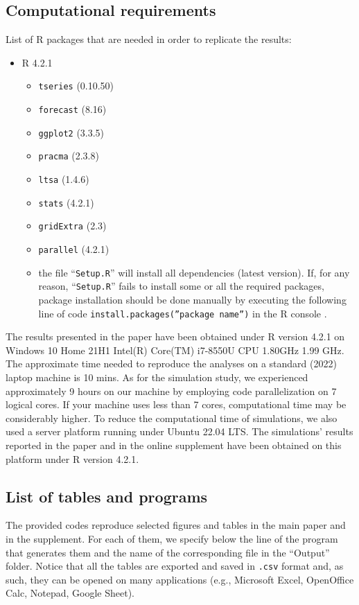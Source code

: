 \documentclass[
]{article}
\providecommand{\tightlist}{%
  \setlength{\itemsep}{0pt}\setlength{\parskip}{0pt}}
\begin{document}
\hypertarget{computational-requirements}{%
\subsection{Computational requirements}\label{computational-requirements}}
List of R packages that are needed in order to replicate the results:
\begin{itemize}
\tightlist

\item
  R 4.2.1

  \begin{itemize}
  \tightlist
  \item
    \texttt{tseries} (0.10.50)
  \item
    \texttt{forecast} (8.16)
  \item 
    \texttt{ggplot2} (3.3.5)
  \item 
    \texttt{pracma} (2.3.8)
  \item 
    \texttt{ltsa} (1.4.6)
  \item 
    \texttt{stats} (4.2.1)
  \item
    \texttt{gridExtra} (2.3)
  \item
    \texttt{parallel} (4.2.1)           
  \item
    the file ``\texttt{Setup.R}'' will install all dependencies
    (latest version). If, for any reason, ``\texttt{Setup.R}'' fails to install some or all the required packages, package installation should be done manually by executing the following line of code \texttt{install.packages(''package name'')} in the R console . 
  \end{itemize}
\end{itemize}

The results presented in the paper have been obtained under R version 4.2.1 on Windows 10 Home 21H1 Intel(R) Core(TM) i7-8550U CPU \@ 1.80GHz   1.99 GHz. The approximate time needed to reproduce the analyses on a standard (2022) laptop machine is 10 mins. 
As for the simulation study, we experienced approximately 9 hours on our machine by employing code parallelization on 7 logical cores. If your machine uses less than 7 cores, computational time may be considerably higher. To reduce the computational time of simulations, we also used a server platform running under Ubuntu 22.04 LTS. The simulations' results reported in the paper and in the online supplement have been obtained on this platform under R version 4.2.1. 

\hypertarget{list-of-tables-and-programs}{%
\subsection{List of tables and
programs}\label{list-of-tables-and-programs}}
The provided codes reproduce selected figures and tables in the main paper and in the supplement. For each of them, we specify below the line of the program that generates them and the name of the corresponding file in the ``Output'' folder. Notice that all the tables are exported and saved in \texttt{.csv} format and, as such, they can be opened on many applications (e.g., Microsoft Excel, OpenOffice Calc, Notepad, Google Sheet). 
\end{document}
